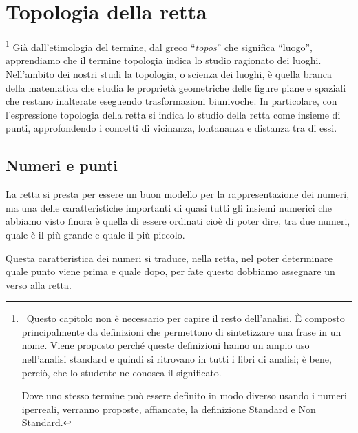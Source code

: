 


\chapter{Topologia della retta}

\footnote{~Questo capitolo non è necessario per capire il resto 
dell'analisi.
È composto principalmente da definizioni che permettono di sintetizzare una 
frase in un nome.
Viene proposto perché queste definizioni hanno un ampio uso nell'analisi 
standard e quindi si ritrovano in tutti i libri di analisi; 
è bene, perciò, che lo studente ne conosca il significato.

Dove uno stesso termine può essere definito in modo diverso 
usando i numeri iperreali, verranno proposte, affiancate, la definizione 
Standard e Non Standard.}
Già dall'etimologia del termine, dal greco ``\emph{topos}'' che significa 
``luogo'', apprendiamo che il termine topologia indica lo studio 
ragionato dei luoghi. 
Nell'ambito dei nostri studi la topologia, o scienza dei luoghi, 
è quella branca della matematica che studia le proprietà geometriche 
delle figure piane e spaziali che restano inalterate eseguendo 
trasformazioni biunivoche. 
In particolare, con l'espressione topologia della retta si indica 
lo studio della retta come insieme di punti, approfondendo i concetti di 
vicinanza, lontananza e distanza tra di essi.

\section{Numeri e punti}
\label{sec:topologianumeripunti}

La retta si presta per essere un buon modello per la rappresentazione dei 
numeri, ma una delle caratteristiche importanti di quasi tutti gli insiemi 
numerici che abbiamo visto finora è quella di essere ordinati cioè di poter 
dire, tra due numeri, quale è il più grande e quale il più piccolo.

Questa caratteristica dei numeri si traduce, nella retta, nel poter 
determinare quale punto viene prima e quale dopo, 
per fate questo dobbiamo assegnare un verso alla retta.


